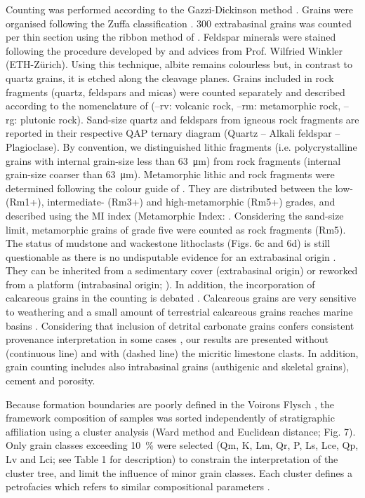 \documentclass[twoside]{article}
\begin{document}
Counting was performed according to the Gazzi-Dickinson method \citep{Dickinson1979a,Ingersoll1979,Dickinson1985}. Grains were organised following the Zuffa classification \citep{Zuffa1980}. 300 extrabasinal grains was counted per thin section using the ribbon method of \cite{VanderPlas1962}. Feldspar minerals were stained following the procedure developed by \cite{Norman1974} and advices from Prof. Wilfried Winkler (ETH-Z\"urich). Using this technique, albite remains colourless but, in contrast to quartz grains, it is etched along the cleavage planes. Grains included in rock fragments (quartz, feldspars and micas) were counted separately \citep{Critelli2007,Stefani2007,DasGupta2008} and described according to the nomenclature of \cite{Weltje2002} (--rv: volcanic rock, --rm: metamorphic rock, --rg: plutonic rock). Sand-size quartz and feldspars from igneous rock fragments are reported in their respective QAP ternary diagram (Quartz -- Alkali feldspar -- Plagioclase). By convention, we distinguished lithic fragments (i.e. polycrystalline grains with internal grain-size less than \SI{63}{\micro\meter}) from rock fragments (internal grain-size coarser than \SI{63}{\micro\meter}). Metamorphic lithic and rock fragments were determined following the colour guide of \cite{Garzanti2003}. They are distributed between the low- (Rm1+), intermediate- (Rm3+) and high-metamorphic (Rm5+) grades, and described using the MI index (Metamorphic Index: \citealp{Garzanti2004,Garzanti2010}. Considering the sand-size limit, metamorphic grains of grade five were counted as rock fragments (Rm5). The status of mudstone and wackestone lithoclasts (Figs. 6c and 6d) is still questionable as there is no undisputable evidence for an extrabasinal origin \citep{Zuffa1980}. They can be inherited from a sedimentary cover (extrabasinal origin) or reworked from a platform (intrabasinal origin; \citealp{Critelli2007}). In addition, the incorporation of calcareous grains in the counting is debated \citep{Dickinson1979a,Mack1984}. Calcareous grains are very sensitive to weathering and a small amount of terrestrial calcareous grains reaches marine basins \citep{Arribas2000,Picard2007}. Considering that inclusion of detrital carbonate grains confers consistent provenance interpretation in some cases \citep{Mack1984}, our results are presented without (continuous line) and with (dashed line) the micritic limestone clasts. In addition, grain counting includes also intrabasinal grains (authigenic and skeletal grains), cement and porosity.\par
\medskip
Because formation boundaries are poorly defined in the Voirons Flysch \citep{Stuijvenberg1980a,Stuijvenberg1980b,Vial1989,Coppo1999}, the framework composition of samples was sorted independently of stratigraphic affiliation using a cluster analysis (Ward method and Euclidean distance; Fig. 7). Only grain classes exceeding 10~\% were selected (Qm, K, Lm, Qr, P, Ls, Lce, Qp, Lv and Lci; see Table 1 for description) to constrain the interpretation of the cluster tree, and limit the influence of minor grain classes. Each cluster defines a petrofacies which refers to similar compositional parameters \citep{Dickinson1972}.
\end{document}
